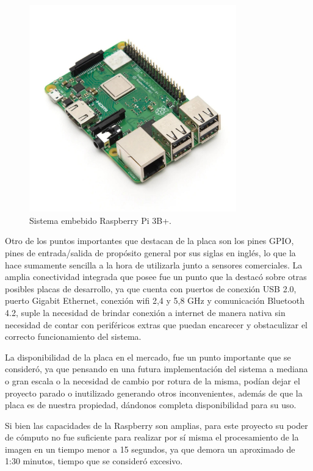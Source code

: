 \begin{figure}
    \centering
    \includegraphics[width=0.8\textwidth]{imgs/Raspberry-pi3b+.jpg}
    \caption{Sistema embebido Raspberry Pi 3B+.}
    \label{fig:raspberry}
\end{figure}
Otro de los puntos importantes que destacan de la placa son los pines GPIO, pines de entrada/salida de propósito general
por sus siglas en inglés, lo que la hace sumamente sencilla a la hora de utilizarla junto a sensores comerciales.
La amplia conectividad integrada que posee fue un punto que la destacó sobre otras posibles placas de desarrollo, ya que
cuenta con puertos de conexión USB 2.0, puerto Gigabit Ethernet, conexión wifi 2,4 y 5,8 GHz y comunicación Bluetooth 4.2,
suple la necesidad de brindar conexión a internet de manera nativa sin necesidad de contar con periféricos extras que
puedan encarecer y obstaculizar el correcto funcionamiento del sistema.


La disponibilidad de la placa en el mercado, fue un punto importante que se consideró, ya que pensando en una futura
implementación del sistema a mediana o gran escala o la necesidad de cambio por rotura de la misma, podían dejar el
proyecto parado o inutilizado generando otros inconvenientes, además de que la placa es de nuestra propiedad, dándonos
completa disponibilidad para su uso.


Si bien las capacidades de la Raspberry son amplias, para este proyecto su poder de cómputo no fue suficiente para realizar por sí misma el procesamiento de la imagen en un tiempo menor a 15 segundos, ya que demora un aproximado de 1:30 minutos, tiempo que se consideró excesivo.

